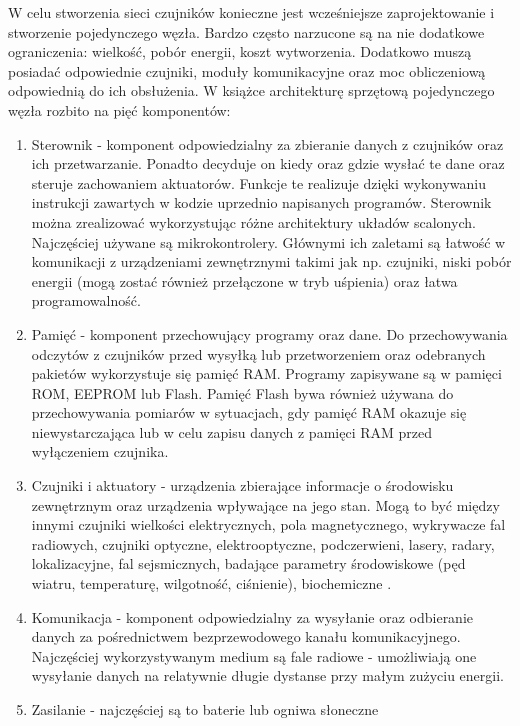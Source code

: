 W celu stworzenia sieci czujników konieczne jest wcześniejsze zaprojektowanie i stworzenie pojedynczego węzła. Bardzo często narzucone są na nie dodatkowe ograniczenia: wielkość, pobór energii, koszt wytworzenia. Dodatkowo muszą posiadać odpowiednie czujniki, moduły komunikacyjne oraz moc obliczeniową odpowiednią do ich obsłużenia. W książce \cite{Karl2006} architekturę sprzętową pojedynczego węzła rozbito na pięć komponentów:
\begin{enumerate}
	\item Sterownik - komponent odpowiedzialny za zbieranie danych z czujników oraz ich przetwarzanie. Ponadto decyduje on kiedy oraz gdzie wysłać te dane oraz steruje zachowaniem aktuatorów. Funkcje te realizuje dzięki wykonywaniu instrukcji zawartych w kodzie uprzednio napisanych programów. Sterownik można zrealizować wykorzystując różne architektury układów scalonych. Najczęściej używane są mikrokontrolery. Głównymi ich zaletami są łatwość w komunikacji z urządzeniami zewnętrznymi takimi jak np. czujniki, niski pobór energii (mogą zostać również przełączone w tryb uśpienia) oraz łatwa programowalność.
	\item Pamięć - komponent przechowujący programy oraz dane. Do przechowywania odczytów z czujników przed wysyłką lub przetworzeniem oraz odebranych pakietów wykorzystuje się pamięć RAM. Programy zapisywane są w pamięci ROM, EEPROM lub Flash. Pamięć Flash bywa również używana do przechowywania pomiarów w sytuacjach, gdy pamięć RAM okazuje się niewystarczająca lub w celu zapisu danych z pamięci RAM przed wyłączeniem czujnika.   
	\item Czujniki i aktuatory - urządzenia zbierające informacje o środowisku zewnętrznym oraz urządzenia wpływające na jego stan. Mogą to być między innymi czujniki wielkości elektrycznych, pola magnetycznego, wykrywacze fal radiowych, czujniki optyczne, elektrooptyczne, podczerwieni, lasery, radary, lokalizacyjne, fal sejsmicznych, badające parametry środowiskowe (pęd wiatru, temperaturę, wilgotność, ciśnienie), biochemiczne \cite{Sohraby2006}.
	\item Komunikacja - komponent odpowiedzialny za wysyłanie oraz odbieranie danych za pośrednictwem bezprzewodowego kanału komunikacyjnego. Najczęściej wykorzystywanym medium są fale radiowe - umożliwiają one wysyłanie danych na relatywnie długie dystanse przy małym zużyciu energii. 
	\item Zasilanie - najczęściej są to baterie lub ogniwa słoneczne
\end{enumerate}

